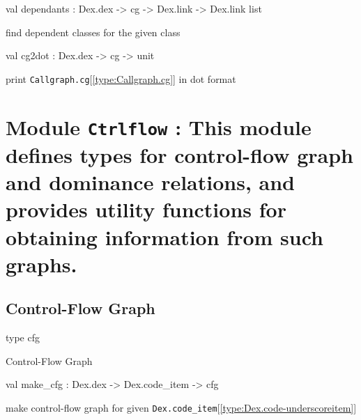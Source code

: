 \documentclass[11pt]{article}
\begin{document}
\label{val:Callgraph.dependants}\begin{ocamldoccode}
val dependants : Dex.dex -> cg -> Dex.link -> Dex.link list
\end{ocamldoccode}
\begin{ocamldocdescription}
find dependent classes for the given class


\end{ocamldocdescription}




\label{val:Callgraph.cg2dot}\begin{ocamldoccode}
val cg2dot : Dex.dex -> cg -> unit
\end{ocamldoccode}
\begin{ocamldocdescription}
print {\tt{Callgraph.cg}}[\ref{type:Callgraph.cg}] in dot format


\end{ocamldocdescription}


\section{Module {\tt{Ctrlflow}} : This module defines types for control-flow graph and dominance relations,
 and provides utility functions for obtaining information from such graphs.}
\label{module:Ctrlflow}




\ocamldocvspace{0.5cm}



\subsection{Control-Flow Graph}




\label{type:Ctrlflow.cfg}\begin{ocamldoccode}
type cfg 
\end{ocamldoccode}
\begin{ocamldocdescription}
Control-Flow Graph


\end{ocamldocdescription}




\label{val:Ctrlflow.make-underscorecfg}\begin{ocamldoccode}
val make_cfg : Dex.dex -> Dex.code_item -> cfg
\end{ocamldoccode}
\begin{ocamldocdescription}
make control-flow graph for given {\tt{Dex.code\_item}}[\ref{type:Dex.code-underscoreitem}]


\end{ocamldocdescription}
\end{document}
